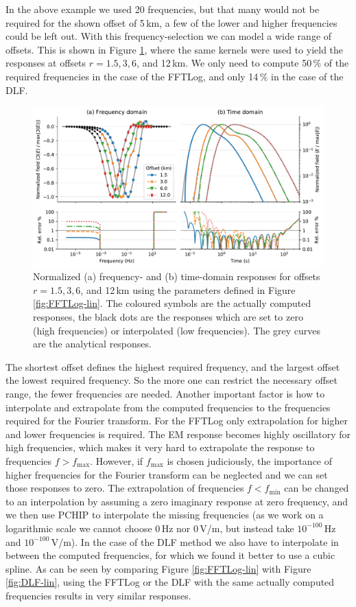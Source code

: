 \documentclass[extra, camera,%
    onecolumn,   %
    referee,     %
]{gji}
\newlength{\fwidth}
\begin{document}
%
In the above example we used 20 frequencies, but that many would not be
required for the shown offset of 5\,km, a few of the lower and higher
frequencies could be left out. With this frequency-selection we can model a
wide range of offsets. This is shown in Figure \ref{fig:multi-offset}, where
the same kernels were used to yield the responses at offsets $r=1.5,3,6$, and
12\,km. We only need to compute 50\,\% of the required frequencies in the case
of the FFTLog, and only 14\,\% in the case of the DLF.
%
\begin{figure}
  \centering
  \includegraphics[width=0.75\fwidth]{03-multi-offset}
  \caption{Normalized (a) frequency- and (b) time-domain responses for offsets
    $r=1.5,3,6$, and 12\,km using the parameters defined in Figure
    \ref{fig:FFTLog-lin}. The coloured symbols are the actually computed
    responses, the black dots are the responses which are set to zero (high
    frequencies) or interpolated (low frequencies). The grey curves are the
    analytical responses.}
  \label{fig:multi-offset}
\end{figure}
%

The shortest offset defines the highest required frequency, and the largest
offset the lowest required frequency. So the more one can restrict the
necessary offset range, the fewer frequencies are needed. Another important
factor is how to interpolate and extrapolate from the computed frequencies to
the frequencies required for the Fourier transform. For the FFTLog only
extrapolation for higher and lower frequencies is required. The EM response
becomes highly oscillatory for high frequencies, which makes it very hard to
extrapolate the response to frequencies $f>f_\mathrm{max}$. However, if
$f_\mathrm{max}$ is chosen judiciously, the importance of higher frequencies
for the Fourier transform can be neglected and we can set those responses to
zero. The extrapolation of frequencies $f<f_\mathrm{min}$ can be changed to an
interpolation by assuming a zero imaginary response at zero frequency, and we
then use PCHIP to interpolate the missing frequencies (as we work on a
logarithmic scale we cannot choose 0\,Hz nor 0\,V/m, but instead take
$10^{-100}$\,Hz and $10^{-100}$\,V/m). In the case of the DLF method we also
have to interpolate in between the computed frequencies, for which we found it
better to use a cubic spline. As can be seen by comparing Figure
\ref{fig:FFTLog-lin} with Figure \ref{fig:DLF-lin}, using the FFTLog or
the DLF with the same actually computed frequencies results in very similar
responses.
\end{document}
